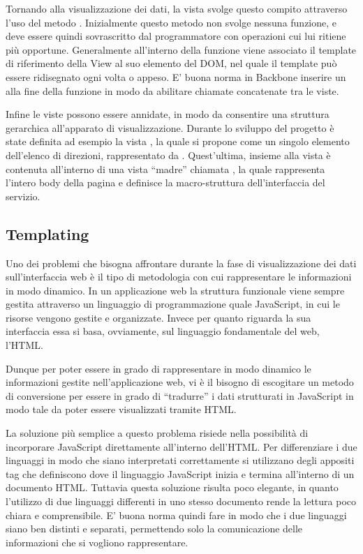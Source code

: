 Tornando alla visualizzazione dei dati, la vista svolge questo compito attraverso l'uso del metodo . Inizialmente questo metodo non svolge nessuna funzione, e deve essere quindi sovrascritto dal programmatore con operazioni cui lui ritiene più opportune.
Generalmente all'interno della funzione  viene associato il template di riferimento della View al suo elemento del DOM, nel quale il template può essere ridisegnato ogni volta o appeso. E' buona norma in Backbone inserire un  alla fine della funzione  in modo da abilitare chiamate concatenate tra le viste.

Infine le viste possono essere annidate, in modo da consentire una struttura gerarchica all'apparato di visualizzazione. Durante lo sviluppo del progetto è state definita ad esempio la vista , la quale si propone come un singolo elemento dell'elenco di direzioni, rappresentato da . Quest'ultima, insieme alla vista  è contenuta all'interno di una vista ``madre'' chiamata , la quale rappresenta l'intero body della pagina e definisce la macro-struttura dell'interfaccia del servizio.

\subsection{Templating} %
\label{sub:templating}

Uno dei problemi che bisogna affrontare durante la fase di visualizzazione dei dati sull'interfaccia web è il tipo di metodologia con cui rappresentare le informazioni in modo dinamico. In un applicazione web la struttura funzionale viene sempre gestita attraverso un linguaggio di programmazione quale JavaScript, in cui le risorse vengono gestite e organizzate. Invece per quanto riguarda la sua interfaccia essa si basa, ovviamente, sul linguaggio fondamentale del web, l'HTML.

Dunque per poter essere in grado di rappresentare in modo dinamico le informazioni gestite nell'applicazione web, vi è il bisogno di escogitare un metodo di conversione per essere in grado di ``tradurre'' i dati strutturati in JavaScript in modo tale da poter essere visualizzati tramite HTML.

La soluzione più semplice a questo problema risiede nella possibilità di incorporare JavaScript direttamente all'interno dell'HTML. Per differenziare i due linguaggi in modo che siano interpretati correttamente si utilizzano degli appositi tag che definiscono dove il linguaggio JavaScript inizia e termina all'interno di un documento HTML. Tuttavia questa soluzione risulta poco elegante, in quanto l'utilizzo di due linguaggi differenti in uno stesso documento rende la lettura poco chiara e comprensibile. E' buona norma quindi fare in modo che i due linguaggi siano ben distinti e separati, permettendo solo la comunicazione delle informazioni che si vogliono rappresentare.

